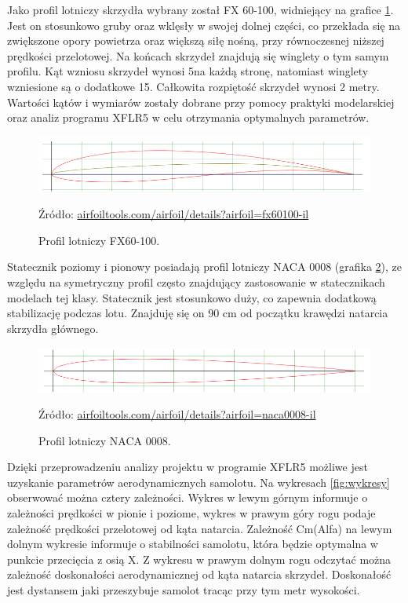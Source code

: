 \documentclass[12pt, a4paper]{article}
\begin{document}
Jako profil lotniczy skrzydła wybrany został FX 60-100, widniejący na grafice \ref{fig:fx60}. Jest on stosunkowo gruby oraz wklęsły w swojej dolnej części, co przekłada się na zwiększone opory powietrza oraz większą siłę nośną, przy równoczesnej niższej prędkości przelotowej. Na końcach skrzydeł znajdują się winglety o tym samym profilu. Kąt wzniosu skrzydeł wynosi 5\textdegree na każdą stronę, natomiast winglety wzniesione są o dodatkowe 15\textdegree. Całkowita rozpiętość skrzydeł wynosi 2 metry. Wartości kątów i wymiarów zostały dobrane przy pomocy praktyki modelarskiej oraz analiz programu XFLR5 w celu otrzymania optymalnych parametrów.

 \begin{figure}[ht]
    \centering
    \includegraphics[width=1\textwidth]{fx60}
    \caption{Profil lotniczy FX60-100.}
    \small Źródło: \url{airfoiltools.com/airfoil/details?airfoil=fx60100-il}
    \label{fig:fx60}
\end{figure}

Statecznik poziomy i pionowy posiadają profil lotniczy NACA 0008 (grafika \ref{fig:naca}), ze względu na symetryczny profil często znajdujący zastosowanie w statecznikach modelach tej klasy. Statecznik jest stosunkowo duży, co zapewnia dodatkową stabilizację podczas lotu. Znajduję się on 90 cm od początku krawędzi natarcia skrzydła głównego.

 \begin{figure}[ht]
    \centering
    \includegraphics[width=1\textwidth]{naca0008}
    \caption{Profil lotniczy NACA 0008.}
    \small Źródło: \url{airfoiltools.com/airfoil/details?airfoil=naca0008-il}
    \label{fig:naca}
\end{figure}

Dzięki przeprowadzeniu analizy projektu w programie XFLR5 możliwe jest uzyskanie parametrów aerodynamicznych samolotu. Na wykresach \ref{fig:wykresy} obserwować można cztery zależności. Wykres w lewym górnym informuje o zależności prędkości w pionie i poziome, wykres w prawym góry rogu podaje zależność prędkości przelotowej od kąta natarcia. Zależność Cm(Alfa) na lewym dolnym wykresie informuje o stabilności samolotu, która będzie optymalna w punkcie przecięcia z osią X. Z wykresu w prawym dolnym rogu odczytać można zależność doskonałości aerodynamicznej od kąta natarcia skrzydeł. Doskonałość jest dystansem jaki przeszybuje samolot tracąc przy tym metr wysokości. 
\end{document}
